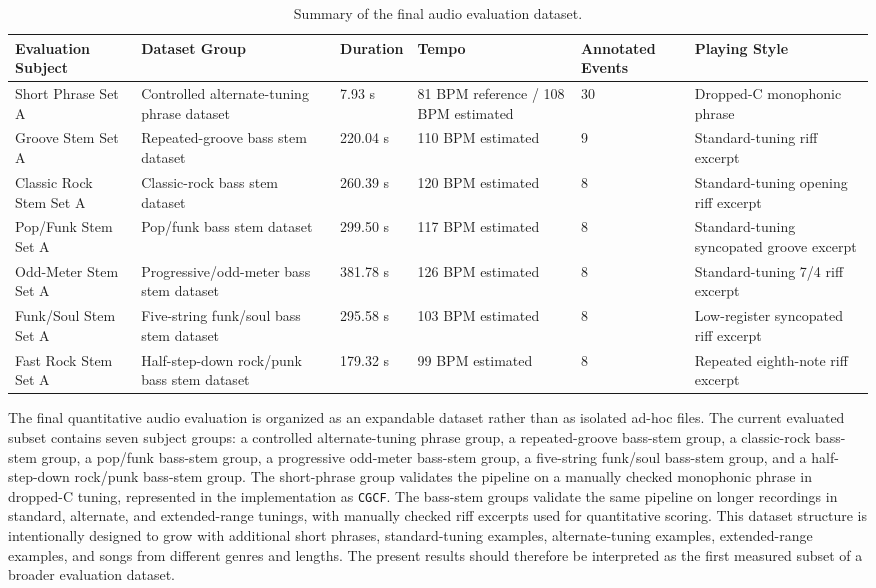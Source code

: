 \documentclass[a4paper, 12pt, titlepage]{article}
\begin{document}
\begin{table}[H]
    \centering
    \begin{tabular}{|p{}|p{}|p{}|p{}|p{}|p{}|}
        \hline
        \textbf{Evaluation Subject} & \textbf{Dataset Group} & \textbf{Duration} & \textbf{Tempo} & \textbf{Annotated Events} & \textbf{Playing Style} \\
        \hline
        Short Phrase Set A & Controlled alternate-tuning phrase dataset & 7.93 s & 81 BPM reference / 108 BPM estimated & 30 & Dropped-C monophonic phrase \\
        \hline
        Groove Stem Set A & Repeated-groove bass stem dataset & 220.04 s & 110 BPM estimated & 9 & Standard-tuning riff excerpt \\
        \hline
        Classic Rock Stem Set A & Classic-rock bass stem dataset & 260.39 s & 120 BPM estimated & 8 & Standard-tuning opening riff excerpt \\
        \hline
        Pop/Funk Stem Set A & Pop/funk bass stem dataset & 299.50 s & 117 BPM estimated & 8 & Standard-tuning syncopated groove excerpt \\
        \hline
        Odd-Meter Stem Set A & Progressive/odd-meter bass stem dataset & 381.78 s & 126 BPM estimated & 8 & Standard-tuning 7/4 riff excerpt \\
        \hline
        Funk/Soul Stem Set A & Five-string funk/soul bass stem dataset & 295.58 s & 103 BPM estimated & 8 & Low-register syncopated riff excerpt \\
        \hline
        Fast Rock Stem Set A & Half-step-down rock/punk bass stem dataset & 179.32 s & 99 BPM estimated & 8 & Repeated eighth-note riff excerpt \\
        \hline
    \end{tabular}
    \caption{Summary of the final audio evaluation dataset.}
    \label{tab:tabee_dataset_summary}
\end{table}

The final quantitative audio evaluation is organized as an expandable dataset rather than as isolated ad-hoc files. The current evaluated subset contains seven subject groups: a controlled alternate-tuning phrase group, a repeated-groove bass-stem group, a classic-rock bass-stem group, a pop/funk bass-stem group, a progressive odd-meter bass-stem group, a five-string funk/soul bass-stem group, and a half-step-down rock/punk bass-stem group. The short-phrase group validates the pipeline on a manually checked monophonic phrase in dropped-C tuning, represented in the implementation as \texttt{CGCF}. The bass-stem groups validate the same pipeline on longer recordings in standard, alternate, and extended-range tunings, with manually checked riff excerpts used for quantitative scoring. This dataset structure is intentionally designed to grow with additional short phrases, standard-tuning examples, alternate-tuning examples, extended-range examples, and songs from different genres and lengths. The present results should therefore be interpreted as the first measured subset of a broader evaluation dataset.
\end{document}
